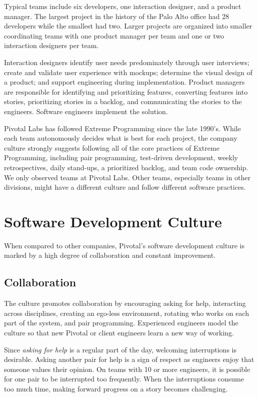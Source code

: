 Typical teams include six developers, one interaction designer, and a product manager. The largest project in the history of the Palo Alto office had 28 developers while the smallest had two. Larger projects are organized into smaller coordinating teams with one product manager per team and one or two interaction designers per team.


Interaction designers identify user needs predominately through user interviews; create and validate user experience with mockups; determine the visual design of a product; and support engineering during implementation. Product managers are responsible for identifying and prioritizing features, converting features into stories, prioritizing stories in a backlog, and communicating the stories to the engineers. Software engineers implement the solution. 


Pivotal Labs has followed Extreme Programming \cite{BeckExtremeProgramming2004} since the late 1990's. While each team autonomously decides what is best for each project, the company culture strongly suggests following all of the core practices of Extreme Programming, including pair programming, test-driven development, weekly retrospectives, daily stand-ups, a prioritized backlog, and team code ownership. We only observed teams at Pivotal Labs. Other teams, especially teams in other divisions, might have a different culture and follow different software practices.


\section{Software Development Culture}
When compared to other companies, Pivotal’s software development culture is marked by a high degree of collaboration and constant improvement.


\subsection{Collaboration}
The culture promotes collaboration by encouraging asking for help, interacting across disciplines, creating an ego-less environment, rotating who works on each part of the system, and pair programming. Experienced engineers model the culture so that new Pivotal or client engineers learn a new way of working.


Since \textit{asking for help} is a regular part of the day, welcoming interruptions is desirable. Asking another pair for help is a sign of respect as engineers enjoy that someone values their opinion. On teams with 10 or more engineers, it is possible for one pair to be interrupted too frequently. When the interruptions consume too much time, making forward progress on a story becomes challenging. 


